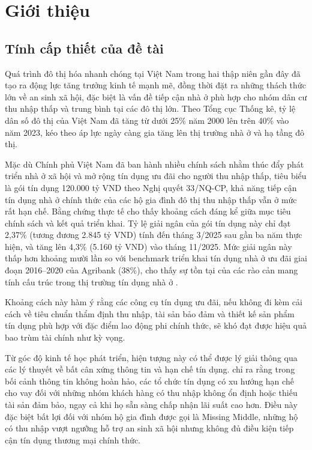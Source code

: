 \documentclass[12pt,a4paper]{report}
\begin{document}
	\chapter{Giới thiệu}
	
	\section{Tính cấp thiết của đề tài}
	
	Quá trình đô thị hóa nhanh chóng tại Việt Nam trong hai thập niên gần đây đã tạo ra động lực tăng trưởng kinh tế mạnh mẽ, đồng thời đặt ra những thách thức lớn về an sinh xã hội, đặc biệt là vấn đề tiếp cận nhà ở phù hợp cho nhóm dân cư thu nhập thấp và trung bình tại các đô thị lớn. Theo Tổng cục Thống kê, tỷ lệ dân số đô thị của Việt Nam đã tăng từ dưới 25\% năm 2000 lên trên 40\% vào năm 2023, kéo theo áp lực ngày càng gia tăng lên thị trường nhà ở và hạ tầng đô thị.
	
	Mặc dù Chính phủ Việt Nam đã ban hành nhiều chính sách nhằm thúc đẩy phát triển nhà ở xã hội và mở rộng tín dụng ưu đãi cho người thu nhập thấp, tiêu biểu là gói tín dụng 120.000 tỷ VND theo Nghị quyết 33/NQ-CP, khả năng tiếp cận tín dụng nhà ở chính thức của các hộ gia đình đô thị thu nhập thấp vẫn ở mức rất hạn chế. Bằng chứng thực tế cho thấy khoảng cách đáng kể giữa mục tiêu chính sách và kết quả triển khai. Tỷ lệ giải ngân của gói tín dụng này chỉ đạt 2,37\% (tương đương 2.845 tỷ VND) tính đến tháng 3/2025 sau gần ba năm thực hiện, và tăng lên 4,3\% (5.160 tỷ VND) vào tháng 11/2025. Mức giải ngân này thấp hơn khoảng mười lần so với benchmark triển khai tín dụng nhà ở ưu đãi giai đoạn 2016–2020 của Agribank (38\%), cho thấy sự tồn tại của các rào cản mang tính cấu trúc trong thị trường tín dụng nhà ở \parencite{CafeLand2025,CafeF2025,SBV2025}. 
	
	Khoảng cách này hàm ý rằng các công cụ tín dụng ưu đãi, nếu không đi kèm cải cách về tiêu chuẩn thẩm định thu nhập, tài sản bảo đảm và thiết kế sản phẩm tín dụng phù hợp với đặc điểm lao động phi chính thức, sẽ khó đạt được hiệu quả bao trùm tài chính như kỳ vọng.
		
	Từ góc độ kinh tế học phát triển, hiện tượng này có thể được lý giải thông qua các lý thuyết về bất cân xứng thông tin và hạn chế tín dụng. \parencite{Stiglitz1981} chỉ ra rằng trong bối cảnh thông tin không hoàn hảo, các tổ chức tín dụng có xu hướng hạn chế cho vay đối với những nhóm khách hàng có thu nhập không ổn định hoặc thiếu tài sản đảm bảo, ngay cả khi họ sẵn sàng chấp nhận lãi suất cao hơn. Điều này đặc biệt bất lợi đối với nhóm hộ gia đình được gọi là Missing Middle, những hộ có thu nhập vượt ngưỡng hỗ trợ an sinh xã hội nhưng không đủ điều kiện tiếp cận tín dụng thương mại chính thức.
	
\end{document}
